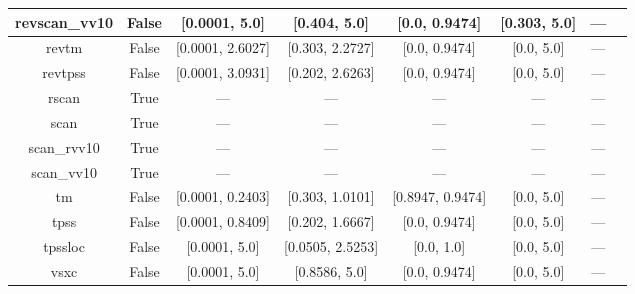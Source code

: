 \begin{tabular}{|c|c|c|c|c|c|c|l|}
revscan\_vv10 &                 False &    [0.0001, 5.0] &     [0.404, 5.0] &    [0.0, 0.9474] &   [0.303, 5.0] &        --- &                                                              \cite{Mezei2018_2469} \\ \hline
        revtm &                 False & [0.0001, 2.6027] &  [0.303, 2.2727] &    [0.0, 0.9474] &     [0.0, 5.0] &        --- &                                                               \cite{Jana2019_6356} \\ \hline
      revtpss &                 False & [0.0001, 3.0931] &  [0.202, 2.6263] &    [0.0, 0.9474] &     [0.0, 5.0] &        --- &                                     \cite{Perdew2009_026403,Perdew2009_026403_err} \\ \hline
        rscan &                  True &              --- &              --- &              --- &            --- &        --- &                                                           \cite{Bartok2019_161101} \\ \hline
         scan &                  True &              --- &              --- &              --- &            --- &        --- &                                                              \cite{Sun2015_036402} \\ \hline
  scan\_rvv10 &                  True &              --- &              --- &              --- &            --- &        --- &                                                             \cite{Peng2016_041005} \\ \hline
   scan\_vv10 &                  True &              --- &              --- &              --- &            --- &        --- &                                                      \cite{Brandenburg2016_115144} \\ \hline
           tm &                 False & [0.0001, 0.2403] &  [0.303, 1.0101] & [0.8947, 0.9474] &     [0.0, 5.0] &        --- &                                                              \cite{Tao2016_073001} \\ \hline
         tpss &                 False & [0.0001, 0.8409] &  [0.202, 1.6667] &    [0.0, 0.9474] &     [0.0, 5.0] &        --- &                                              \cite{Tao2003_146401,Perdew2004_6898} \\ \hline
      tpssloc &                 False &    [0.0001, 5.0] & [0.0505, 2.5253] &       [0.0, 1.0] &     [0.0, 5.0] &        --- &                                                       \cite{Constantin2012_035130} \\ \hline
         vsxc &                 False &    [0.0001, 5.0] &    [0.8586, 5.0] &    [0.0, 0.9474] &     [0.0, 5.0] &        --- &                                                          \cite{VanVoorhis1998_400} \\ \hline
\end{tabular}